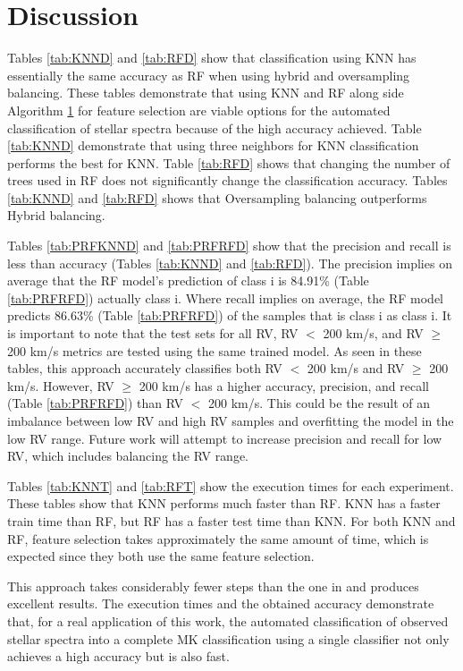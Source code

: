 \documentclass[trackchanges, floatfix, twocolumn, tighten]{aastex62}
\begin{document}
\section{Discussion}\label{sec:discussion}

	Tables \ref{tab:KNND} and \ref{tab:RFD} show that classification using KNN has essentially the same accuracy as RF when using hybrid and oversampling balancing. These tables demonstrate that using KNN and RF along side Algorithm \hyperlink{alg:FS}{1} for feature selection are viable options for the automated classification of stellar spectra because of the high accuracy achieved. Table \ref{tab:KNND} demonstrate that using three neighbors for KNN classification performs the best for KNN. Table \ref{tab:RFD} shows that changing the number of trees used in RF does not significantly change the classification accuracy. Tables \ref{tab:KNND} and \ref{tab:RFD} shows that Oversampling balancing outperforms Hybrid balancing. 

Tables \ref{tab:PRFKNND} and \ref{tab:PRFRFD} show that the precision and recall is less than accuracy (Tables \ref{tab:KNND} and \ref{tab:RFD}). The precision implies on average that the RF model's prediction of class i is 84.91\% (Table \ref{tab:PRFRFD}) actually class i. Where recall implies on average, the RF model predicts 86.63\% (Table \ref{tab:PRFRFD}) of the samples that is class i as class i. It is important to note that the test sets for all RV, RV $<$ 200 km/s, and RV $\geq$ 200 km/s metrics are tested using the same trained model. As seen in these tables, this approach accurately classifies both RV $<$ 200 km/s and RV $\geq$ 200 km/s. However, RV $\geq$ 200 km/s has a higher accuracy, precision, and recall (Table \ref{tab:PRFRFD}) than RV $<$ 200 km/s. This could be the result of an imbalance between low RV and high RV samples and overfitting the model in the low RV range. Future work will attempt to increase precision and recall for low RV, which includes balancing the RV range. 

Tables \ref{tab:KNNT} and \ref{tab:RFT} show the execution times for each experiment. These tables show that KNN performs much faster than RF. KNN has a faster train time than RF, but RF has a faster test time than KNN. For both KNN and RF, feature selection takes approximately the same amount of time, which is expected since they both use the same feature selection.
	
This approach takes considerably fewer steps than the one in \cite{Bolton} and produces excellent results. The execution times and the obtained accuracy demonstrate that, for a real application of this work, the automated classification of observed stellar spectra into a complete MK classification using a single classifier not only achieves a high accuracy but is also fast.
\end{document}
